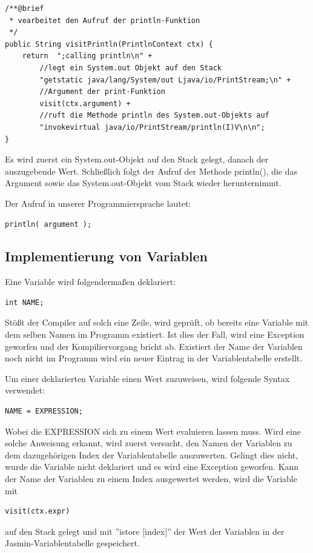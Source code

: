 \scriptsize \begin{lstlisting}[frame=single]
/**@brief
 * vearbeitet den Aufruf der println-Funktion
 */
public String visitPrintln(PrintlnContext ctx) {
	return  ";calling println\n" + 
		//legt ein System.out Objekt auf den Stack
		"getstatic java/lang/System/out Ljava/io/PrintStream;\n" + 	
		//Argument der print-Funktion
		visit(ctx.argument) + 						
		//ruft die Methode println des System.out-Objekts auf
		"invokevirtual java/io/PrintStream/println(I)V\n\n"; 				
}
\end{lstlisting}

\normalsize
Es wird zuerst ein System.out-Objekt auf den Stack gelegt, danach der auszugebende Wert. Schließlich folgt der Aufruf der Methode println(), die das Argument sowie das System.out-Objekt vom Stack wieder herunternimmt.


Der Aufruf in unserer Programmiersprache lautet: 
\begin{lstlisting}[frame=single]
println( argument );
\end{lstlisting}

\subsection{Implementierung von Variablen}
Eine Variable wird folgendermaßen deklariert:
\begin{lstlisting}[frame=single]
int NAME;
\end{lstlisting}
Stößt der Compiler auf solch eine Zeile, wird geprüft, ob bereits eine Variable mit dem selben Namen im Programm existiert. Ist dies der Fall, wird eine Exception geworfen und der Kompiliervorgang bricht ab. Existiert der Name der Variablen noch nicht im Programm wird ein neuer Eintrag in der Variablentabelle erstellt.

Um einer deklarierten Variable einen Wert zuzuweisen, wird folgende Syntax verwendet:
\begin{lstlisting}[frame=single]
NAME = EXPRESSION;
\end{lstlisting}
Wobei die EXPRESSION sich zu einem Wert evaluieren lassen muss.
Wird eine solche Anweisung erkannt, wird zuerst versucht, den Namen der Variablen zu dem dazugehörigen Index der Variablentabelle auszuwerten. Gelingt dies nicht, wurde die Variable nicht deklariert und es wird eine Exception geworfen. Kann der Name der Variablen zu einem Index ausgewertet werden, wird die Variable mit 
\begin{lstlisting}[frame=single]
visit(ctx.expr)
\end{lstlisting}
auf den Stack gelegt und mit ''istore [index]'' der Wert der Variablen in der Jasmin-Variablentabelle gespeichert.

